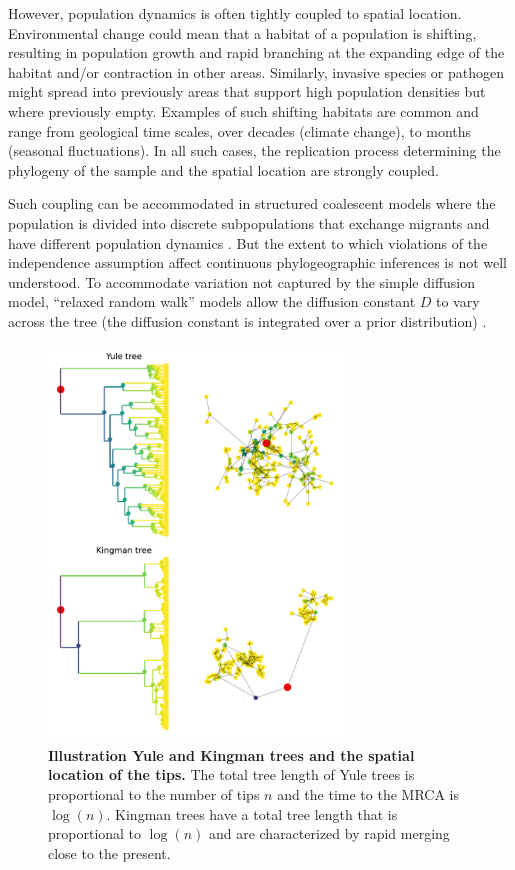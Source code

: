 \documentclass[aps,rmp, twocolumn]{revtex4}
\begin{document}
However, population dynamics is often tightly coupled to spatial location.
Environmental change could mean that a habitat of a population is shifting, resulting in population growth and rapid branching at the expanding edge of the habitat and/or contraction in other areas.
Similarly, invasive species or pathogen might spread into previously areas that support high population densities but where previously empty.
Examples of such shifting habitats are common and range from geological time scales, over decades (climate change), to months (seasonal fluctuations).
In all such cases, the replication process determining the phylogeny of the sample and the spatial location are strongly coupled.

Such coupling can be accommodated in structured coalescent models where the population is divided into discrete subpopulations that exchange migrants and have different population dynamics \citep{vaughan_efficient_2014}.
But the extent to which violations of the independence assumption affect continuous phylogeographic inferences is not well understood.
To accommodate variation not captured by the simple diffusion model, ``relaxed random walk'' models allow the diffusion constant $D$ to vary across the tree (the diffusion constant is integrated over a prior distribution) \citep{dellicour_relax_2021,lemey_phylogeography_2010}.

\begin{figure}[tb]
    \includegraphics*[width=0.7\textwidth]{figures/illustration_tree.pdf}
    \caption{\label{fig:illustration_tree}{\bf Illustration Yule and Kingman trees and the spatial location of the tips.}
    The total tree length of Yule trees is proportional to the number of tips $n$ and the time to the MRCA is $\log(n)$.
    Kingman trees have a total tree length that is proportional to $\log(n)$ and are characterized by rapid merging close to the present. }
\end{figure}
\end{document}
